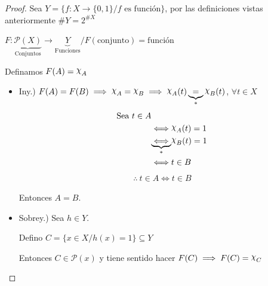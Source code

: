 %
\begin{proof}\phantom{.}

    Sea $Y = \{f: X \to \{0,1\} / f \text{ es función} \}$, por las
    definiciones vistas anteriormente $\# Y = 2^{\# X}$

    $F: \underbrace{\mathcal{P}(X)}_{\text{Conjuntos}} 
    \to \underbrace{Y}_{\text{Funciones}} / 
    F(\text{conjunto}) = \text{función}$

    \medskip

    Definamos $F(A) = \Chi_A$

    \begin{itemize}
        \item Iny.) 
            $F(A) = F(B) \implies \Chi_A = \Chi_B 
            \implies \Chi_A (t) \underbrace{=}_{*} 
            \Chi_B (t) $, $\forall t \in X$
           \begin{align*}
               \text{Sea } t \in A \phantom{\iff} & \\
               \iff &\Chi_A (t) = 1 \\
               \underbrace{\iff}_{*} &\Chi_B (t) = 1 \\
               \iff & t \in B
           \end{align*}
           \begin{gather*}
               \therefore ~  t \in A \iff t \in B
           \end{gather*}

           Entonces $A = B$.
       \item Sobrey.) Sea $h \in Y$.

           Defino $C = \{ x \in X / h(x) = 1 \} \subseteq Y$

           Entonces $C \in \mathcal{P}(x)$ y tiene sentido hacer 
           $F(C) \implies F(C) = \Chi_C$


\end{itemize}
\end{proof}
